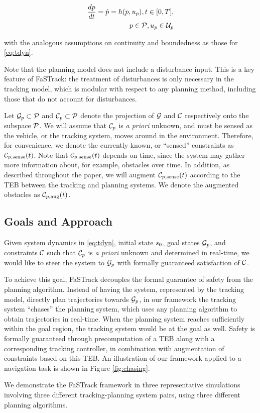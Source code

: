 \begin{align}
\label{eq:pdyn}
\frac{d\pstate}{d\tvar} = \dot{\pstate} = \pdyn(\pstate, \pctrl), \tvar \in [0, \thor], \\
\pstate \in \pset, \pctrl \in \pcset
\end{align}

\noindent with the analogous assumptions on continuity and boundedness as those for \eqref{eq:tdyn}.

Note that the planning model does not include a disturbance input. 
This is a key feature of FaSTrack: the treatment of disturbances is only necessary in the tracking model, which is modular with respect to any planning method, including those that do not account for disturbances.

Let $\mathcal G_p \subset \mathcal{P}$ and $\mathcal C_p \subset \mathcal{P}$ denote the projection of $\mathcal G$ and $\mathcal C$ respectively onto the subspace $\mathcal{P}$.
We will assume that $\mathcal C_p$ is \textit{a priori} unknown, and must be sensed as the vehicle, or the tracking system, moves around in the environment.
Therefore, for convenience, we denote the currently known, or ``sensed'' constraints as $\mathcal C_{p,\text{sense}}(t)$.
Note that $\mathcal C_{p,\text{sense}}(t)$ depends on time, since the system may gather more information about, for example, obstacles over time.
In addition, as described throughout the paper, we will augment $\mathcal C_{p,\text{sense}}(t)$ according to the TEB between the tracking and planning systems.
We denote the augmented obstacles as $\mathcal C_{p,\text{aug}}(t)$.

\subsection{Goals and Approach}
Given system dynamics in \eqref{eq:tdyn}, initial state $s_0$, goal states $\mathcal G_p$, and constraints $\mathcal C$ such that $\mathcal C_p$ is \textit{a priori} unknown and determined in real-time, we would like to steer the system to $\mathcal G_p$ with formally guaranteed satisfaction of $\mathcal C$.

To achieve this goal, FaSTrack decouples the formal guarantee of safety from the planning algorithm.
Instead of having the system, represented by the tracking model, directly plan trajectories towards $\mathcal G_p$, in our framework the tracking system ``chases'' the planning system, which uses any planning algorithm to obtain trajectories in real-time.
When the planning system reaches sufficiently within the goal region, the tracking system would be at the goal as well.
Safety is formally guaranteed through precomputation of a TEB along with a corresponding tracking controller, in combination with augmentation of constraints based on this TEB.
An illustration of our framework applied to a navigation task is shown in Figure \ref{fig:chasing}.

We demonstrate the FaSTrack framework in three representative simulations involving three different tracking-planning system pairs, using three different planning algorithms.